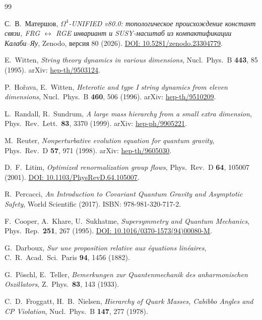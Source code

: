 \documentclass[11pt,a4paper]{article}
\theoremstyle{definition}
\begin{document}
\begin{thebibliography}{99}

С.~В.~Матершов,
\textit{$\Omega^4$-UNIFIED v80.0: топологическое происхождение констант
связи, FRG $\leftrightarrow$ RGE инвариант и SUSY-масштаб
из компактификации Калаби--Яу},
Zenodo, версия 80 (2026).
\href{https://doi.org/10.5281/zenodo.23304779}{DOI: 10.5281/zenodo.23304779}.

E.~Witten,
\textit{String theory dynamics in various dimensions},
Nucl.\ Phys.\ B \textbf{443}, 85 (1995).
arXiv: \href{https://arxiv.org/abs/hep-th/9503124}{hep-th/9503124}.

P.~Ho\v{r}ava, E.~Witten,
\textit{Heterotic and type I string dynamics from eleven dimensions},
Nucl.\ Phys.\ B \textbf{460}, 506 (1996).
arXiv: \href{https://arxiv.org/abs/hep-th/9510209}{hep-th/9510209}.

L.~Randall, R.~Sundrum,
\textit{A large mass hierarchy from a small extra dimension},
Phys.\ Rev.\ Lett.\ \textbf{83}, 3370 (1999).
arXiv: \href{https://arxiv.org/abs/hep-ph/9905221}{hep-ph/9905221}.

M.~Reuter,
\textit{Nonperturbative evolution equation for quantum gravity},
Phys.\ Rev.\ D \textbf{57}, 971 (1998).
arXiv: \href{https://arxiv.org/abs/hep-th/9605030}{hep-th/9605030}.

D.~F.~Litim,
\textit{Optimized renormalization group flows},
Phys.\ Rev.\ D \textbf{64}, 105007 (2001).
\href{https://doi.org/10.1103/PhysRevD.64.105007}{DOI: 10.1103/PhysRevD.64.105007}.

R.~Percacci,
\textit{An Introduction to Covariant Quantum Gravity and Asymptotic Safety},
World Scientific (2017).
ISBN: 978-981-320-717-2.

F.~Cooper, A.~Khare, U.~Sukhatme,
\textit{Supersymmetry and Quantum Mechanics},
Phys.\ Rep.\ \textbf{251}, 267 (1995).
\href{https://doi.org/10.1016/0370-1573(94)00080-M}{DOI: 10.1016/0370-1573(94)00080-M}.

G.~Darboux,
\textit{Sur une proposition relative aux \'equations lin\'eaires},
C.\ R.\ Acad.\ Sci.\ Paris \textbf{94}, 1456 (1882).

G.~P\"oschl, E.~Teller,
\textit{Bemerkungen zur Quantenmechanik des anharmonischen Oszillators},
Z.\ Phys.\ \textbf{83}, 143 (1933).

C.~D.~Froggatt, H.~B.~Nielsen,
\textit{Hierarchy of Quark Masses, Cabibbo Angles and CP Violation},
Nucl.\ Phys.\ B \textbf{147}, 277 (1978).


\end{thebibliography}
\end{document}
